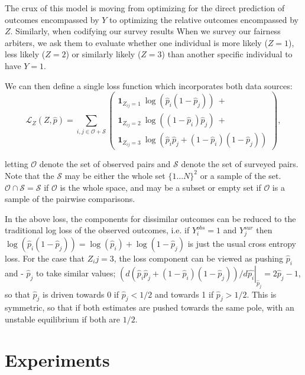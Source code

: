     The crux of this model is moving from optimizing for the direct prediction of outcomes encompassed by $Y$ to optimizing the relative outcomes encompassed by $Z$.  Similarly, when codifying our survey results When we survey our fairness arbiters, we ask them to evaluate whether one individual is more likely ($Z = 1$), less likely ($Z = 2$) or similarly likely ($Z = 3$) than another specific individual to have $Y = 1$.
    
    We can then define a single loss function which incorporates both data sources:
    $$ \mathcal{L}_Z(Z, \hat{p}) = \sum\limits_{i, j \in \mathcal{O} + \mathcal{S}} \left(\begin{array}{l} 
        \mathbf{1}_{Z_{ij} = 1} ~ \log\left( \hat{p}_i (1 - \hat{p}_j)  \right) ~ + \\
        \mathbf{1}_{Z_{ij} = 2} ~ \log\left( (1 - \hat{p}_i) \hat{p}_j  \right) ~ + \\
        \mathbf{1}_{Z_{ij} = 3} ~ \log\left(\hat{p}_i \hat{p}_j + (1 - \hat{p}_i)(1 - \hat{p}_j) \right)
    \end{array}\right), \label{eq:sm_pairwise_loss}$$
    
    letting $\mathcal{O}$ denote the set of observed pairs and $\mathcal{S}$ denote the set of surveyed pairs.  Note that the $\mathcal{S}$ may be either the whole set $\{1 \ldots N\}^2$ or a sample of the set.  $\mathcal{O} \cap \mathcal{S} = \mathcal{S}$ if $\mathcal{O}$ is the whole space, and may be a subset or empty set if $\mathcal{O}$ is a sample of the pairwise comparisons.
    
    In the above loss, the components for dissimilar outcomes can be reduced to the traditional log loss of the observed outcomes, i.e. if $Y_i^{obs} = 1$ and $Y_j^{sur}$ then 
    $ \log\left( \hat{p}_i (1 - \hat{p}_j)  \right) = \log\left( \hat{p}_i \right) + \log\left(1 - \hat{p}_j  \right)$ 
    is just the usual cross entropy loss.  For the case that $Z_ij = 3$, the loss component can be viewed as pushing $\hat{p}_i$ and  - $\hat{p}_j$ to take similar values; $\left(d \left(\hat{p}_i \hat{p}_j + (1 - \hat{p}_i)(1 - \hat{p}_j) \right)/d\hat{p_i}\right|_{\hat{p}_j} = 2\hat{p}_j - 1$, so that $\hat{p}_j$ is driven towards 0 if $\hat{p}_j < 1/2$ and towards 1 if $\hat{p}_j > 1/2$.  This is symmetric, so that if both estimates are pushed towards the same pole, with an unstable equilibrium if both are $1/2$.

\section{Experiments}\label{sec:softmono_experiments}

